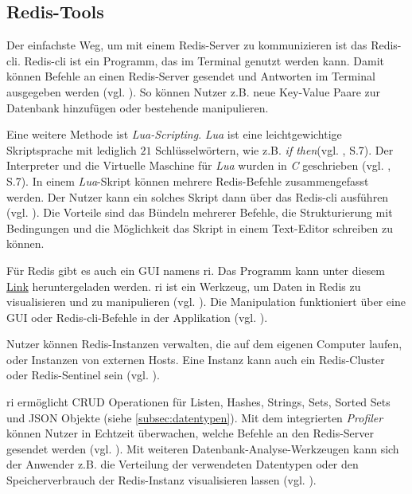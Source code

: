 
\subsection{Redis-Tools}
\label{subsec:tools}

Der einfachste Weg, um mit einem \ac{Redis}-Server zu kommunizieren ist das \ac{Redis-cli}. \ac{Redis-cli} ist ein Programm, das im Terminal genutzt werden kann. Damit können Befehle an einen \ac{Redis}-Server gesendet und Antworten im Terminal ausgegeben werden (vgl. \cite{Redis-Docs-cli}). So können Nutzer z.B. neue Key-Value Paare zur Datenbank hinzufügen oder bestehende manipulieren.

Eine weitere Methode ist \textit{Lua-Scripting}. \textit{Lua} ist eine leichtgewichtige Skriptsprache mit lediglich $21$ Schlüsselwörtern, wie z.B. \glqq \textit{if then}\grqq (vgl. \cite{17}, S.7). Der Interpreter und die Virtuelle Maschine für \textit{Lua} wurden in \textit{C} geschrieben (vgl. \cite{17}, S.7). In einem \textit{Lua}-Skript können mehrere \ac{Redis}-Befehle zusammengefasst werden. Der Nutzer kann ein solches Skript dann über das \ac{Redis-cli} ausführen (vgl. \cite{Redis-Docs-cli}). Die Vorteile sind das Bündeln mehrerer Befehle, die Strukturierung mit Bedingungen und die Möglichkeit das Skript in einem Text-Editor schreiben zu können.

Für \ac{Redis} gibt es auch ein \ac{GUI} namens \gls{ri}. Das Programm kann unter diesem \href{https://redis.com/redis-enterprise/redis-insight/?_gl=1*128mfio*_ga*OTc4MjQ4NDk1LjE3MDI2NjI1MzY.*_ga_8BKGRQKRPV*MTcwMjcxMzU2Ny4zLjEuMTcwMjcyMTEyNS42MC4wLjA.*_gcl_au*MTYxMzA5MjQ2MS4xNzAyNjYyNTM2&_ga=2.55945451.1702553176.1702662536-978248495.1702662536}{Link} heruntergeladen werden. \gls{ri} ist ein Werkzeug, um Daten in \ac{Redis} zu visualisieren und zu manipulieren (vgl. \cite{Redis-Docs-RI}). Die Manipulation funktioniert über eine \ac{GUI} oder \ac{Redis-cli}-Befehle in der Applikation (vgl. \cite{Redis-Docs-RI}). 

Nutzer können \ac{Redis}-Instanzen verwalten, die auf dem eigenen Computer laufen, oder Instanzen von externen Hosts. Eine Instanz kann auch ein \ac{Redis}-Cluster oder \ac{Redis}-Sentinel sein (vgl. \cite{Redis-Docs-RI}).

\gls{ri} ermöglicht \ac{CRUD} Operationen für Listen, Hashes, Strings, Sets, Sorted Sets und JSON Objekte (siehe \autoref{subsec:datentypen}). Mit dem integrierten \textit{Profiler} können Nutzer in Echtzeit überwachen, welche Befehle an den \ac{Redis}-Server gesendet werden (vgl. \cite{Redis-Docs-RI}). Mit weiteren Datenbank-Analyse-Werkzeugen kann sich der Anwender z.B. die Verteilung der verwendeten Datentypen oder den Speicherverbrauch der \ac{Redis}-Instanz visualisieren lassen (vgl. \cite{Redis-Docs-RI}).